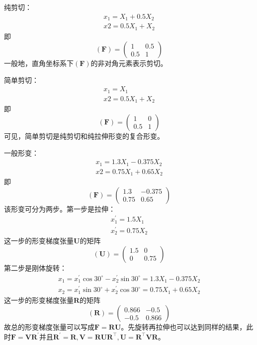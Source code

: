 \documentclass[main.tex]{subfiles}
\begin{document}
\begin{example}
纯剪切：
\[\begin{array}{l}
x_1=X_1+0.5X_2\\
x2=0.5X_1+X_2
\end{array}\]
即
\[\left(\mathbf{F}\right)=\left(\begin{array}{cc}1&0.5\\0.5&1\end{array}\right)\]
一般地，直角坐标系下$\left(\mathbf{F}\right)$的非对角元素表示剪切。

简单剪切：
\[\begin{array}{l}
x_1=X_1\\
x2=0.5X_1+X_2
\end{array}\]
即
\[\left(\mathbf{F}\right)=\left(\begin{array}{cc}1&0\\0.5&1\end{array}\right)\]
可见，简单剪切是纯剪切和纯拉伸形变的复合形变。

一般形变：
\[\begin{array}{l}
x_1=1.3X_1-0.375X_2\\
x2=0.75X_1+0.65X_2
\end{array}\]
即
\[\left(\mathbf{F}\right)=\left(\begin{array}{cc}1.3&-0.375\\0.75&0.65\end{array}\right)\]
该形变可分为两步。第一步是拉伸：
\[\begin{array}{l}
x^\prime_1=1.5X_1\\
x^\prime_2=0.75X_2
\end{array}\]
这一步的形变梯度张量$\mathbf{U}$的矩阵
\[\left(\mathbf{U}\right)=\left(\begin{array}{cc}1.5&0\\0&0.75\end{array}\right)\]
第二步是刚体旋转：
\[\begin{array}{l}
x_1=x^\prime_1\cos30^\circ-x^\prime_2\sin30^\circ=1.3X_1-0.375X_2\\
x_2=x^\prime_1\sin30^\circ+x^\prime_2\cos30^\circ=0.75X_1+0.65X_2
\end{array}\]
这一步的形变梯度张量$\mathbf{R}$的矩阵
\[\left(\mathbf{R}\right)=\left(\begin{array}{cc}0.866&-0.5\\-0.5&0.866\end{array}\right)\]
故总的形变梯度张量可以写成$\mathbf{F}=\mathbf{RU}$。先旋转再拉伸也可以达到同样的结果，此时$\mathbf{F}=\mathbf{VR}^\prime$并且$\mathbf{R}^\prime=\mathbf{R},\mathbf{V}=\mathbf{RUR}^\intercal,\mathbf{U}=\mathbf{R}^\intercal\mathbf{VR}$。
\end{example}
\end{document}

